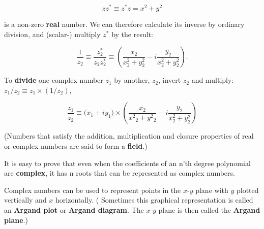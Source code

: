 \begin{equation*}
  zz^* \equiv z^*z = x^2 + y^2
\end{equation*}

is a non-zero \textbf{real} number. We can therefore calculate its inverse by ordinary division, and (scalar-) multiply $z^*$ by the result:

\begin{equation}
  \frac{1}{z_2} \equiv \frac{z_2^*}{z_2z_2^*} \equiv \left(\frac{x_2}{x_2^2 + y_2^2} - i \frac{y_2}{x_2^2 + y_2^2}\right).
\end{equation}

To \textbf{divide} one complex number $z_1$ by another, $z_2$, invert $z_2$ and multiply: $z_1/z_2 \equiv z_1 \times (1/z_2)$, \ie

\begin{equation}
  \frac{z_1}{z_2} \equiv \big(x_1 + iy_1\big) \times \left(\frac{x_2}{x{^2}{_2} + y{^2}{_2}} - i \frac{y_2}{x_2^2 + y_2^2}\right)
\end{equation}

(Numbers that satisfy the addition, multiplication and closure properties of real or complex numbers are said to form a \textbf{field}.)

It is easy to prove that even when the coefficients of an n'th degree polynomial are \textbf{complex}, it has n roots that can be represented as complex numbers.

Complex numbers can be used to represent points in the $x$-$y$ plane with $y$ plotted vertically and $x$ horizontally. ( Sometimes this graphical representation is called an \textbf{Argand plot} or \textbf{Argand diagram}. The $x$-$y$ plane is then called the \textbf{Argand plane}.)

